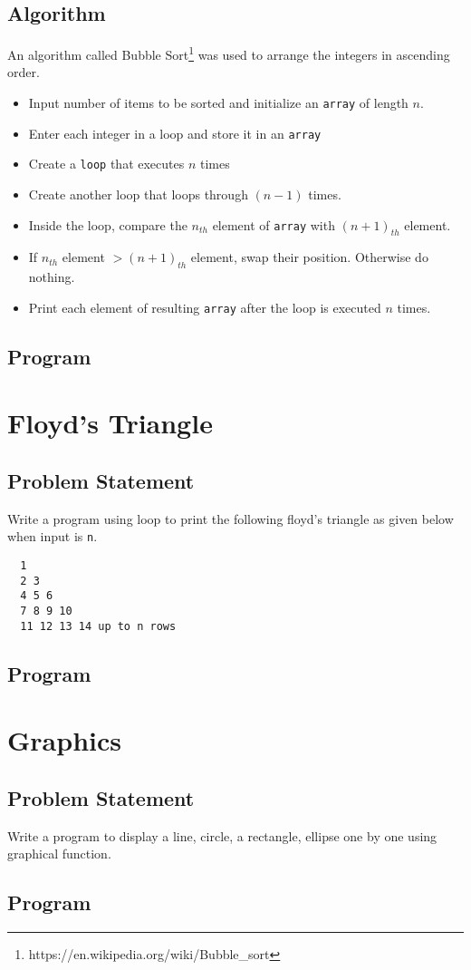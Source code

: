 \documentclass[11pt]{report}
\begin{document}
\section{Algorithm}
An algorithm called Bubble Sort\footnote{https://en.wikipedia.org/wiki/Bubble\_sort} was used to arrange the integers in ascending order.
\begin{itemize}
\item Input number of items to be sorted and initialize an \texttt{array} of length $n$.
\item Enter each integer in a loop and store it in an \texttt{array}
\item Create a \texttt{loop} that executes $n$ times
\item Create another loop that loops through $(n-1)$ times.
\item Inside the loop, compare the $n_{th}$ element of \texttt{array} with $(n+1)_{th}$ element.
\item If $n_{th}$ element $> (n+1)_{th}$ element, swap their position. Otherwise do nothing.
\item Print each element of resulting \texttt{array} after the loop is executed $n$ times.
\end{itemize}
\section{Program}



\chapter{Floyd's Triangle}
\section{Problem Statement}
Write a program using loop to print the following floyd's triangle as given below when input is \texttt{n}.
\begin{lstlisting}
  1
  2 3
  4 5 6
  7 8 9 10
  11 12 13 14 up to n rows
  \end{lstlisting}
\section{Program}



\chapter{Graphics}
\section{Problem Statement}
Write a program to display a line, circle, a rectangle, ellipse one by one using graphical function.
\section{Program}

\end{document}
